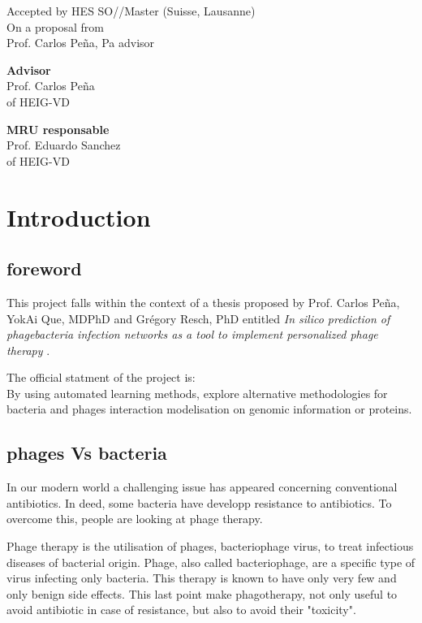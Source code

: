 \documentclass[a4paper,11pt]{report}
\begin{document}
\newpage
\mbox{}

\vspace{0.5cm}
{
\huge Accepted by HES SO//Master (Suisse, Lausanne) \\
\huge On a proposal from\\
\huge Prof. Carlos Peña, Pa advisor
}

\vspace{8cm}
\textbf{Advisor} \\
Prof. Carlos Peña \\
of HEIG-VD

\vspace{3cm}
\textbf{MRU responsable} \\
Prof. Eduardo Sanchez \\
of HEIG-VD
\newpage

\tableofcontents


\chapter{Introduction}
\section{foreword}
This project falls within the context of a thesis proposed by Prof. Carlos Peña, YokAi
Que, MDPhD and Grégory Resch, PhD entitled \textit{In silico prediction of phagebacteria
infection networks as a tool to implement personalized phage therapy} \cite{ref1}.

The official statment of the project is:\\
By using automated learning methods, explore alternative methodologies for bacteria and phages interaction modelisation on genomic information or proteins.


\section{phages Vs bacteria}
In our modern world a challenging issue has appeared concerning conventional antibiotics. In deed, some bacteria have developp resistance to antibiotics. To overcome this, people are looking at phage therapy. 

Phage therapy is the utilisation of phages, bacteriophage virus, to treat infectious diseases of bacterial origin. Phage, also called bacteriophage, are a specific type of virus infecting only bacteria. This therapy is known to have only very few and only benign side effects. This last point make phagotherapy, not only useful to avoid antibiotic in case of resistance, but also to avoid their "toxicity".
\end{document}
